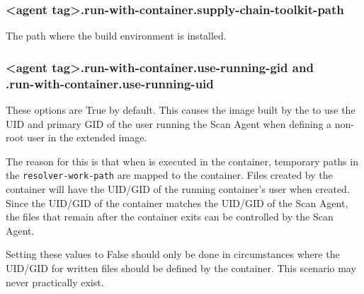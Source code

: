 \subsubsection{<agent tag>.run-with-container.supply-chain-toolkit-path}\label{sec:agent-supply-chain-toolkit-path}
The path where the \toolkit build environment is installed.

\subsubsection{<agent tag>.run-with-container.use-running-gid and\\<agent tag>.run-with-container.use-running-uid}\label{sec:agent-use-running}
These options are True by default.  This causes the image built by the \toolkit to use the
UID and primary GID of the user running the Scan Agent when defining a non-root
user in the extended image.  

The reason for this is that when \scaresolver is executed in the container, temporary paths
in the \texttt{resolver-work-path} are mapped to the container.  Files created by the container
will have the UID/GID of the running container's user when created.  Since the UID/GID of the
container matches the UID/GID of the Scan Agent, the files that remain after
the container exits can be controlled by the Scan Agent.

Setting these values to False should only be done in circumstances where the UID/GID for written files
should be defined by the container.  This scenario may never practically exist.

